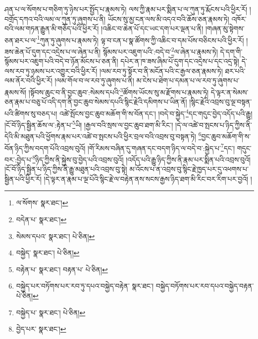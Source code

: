 ཤན་པ་ལ་སོགས་པ་གཅིག་ཏུ་ཉེས་པར་སྤྱོད་པ་རྣམས་ཏེ། ལས་ཀྱི་རྣམ་པར་སྨིན་པ་ལ་ཀུན་ཏུ་རྨོངས་པའི་ཕྱིར་རོ། །བགྲོད་དཀའ་བའི་ལམ་ལ་ཀུན་ཏུ་ཞུགས་པ་ནི། ཡོངས་སུ་མྱ་ངན་ལས་མི་འདའ་བའི་ཆོས་ཅན་རྣམས་ཏེ། འཁོར་བའི་ལམ་གཏན་རྒྱུན་མི་གཅོད་པའི་ཕྱིར་རོ། །འཆིང་བ་ཆེན་པོ་དང་ཡང་དག་པར་ལྡན་པ་ནི། །གཞན་མུ་སྟེགས་ཅན་ཐར་པ་ལ་\footnote{ལ་སོགས་  སྣར་ཐང་། }ཀུན་ཏུ་ཞུགས་པ་རྣམས་ཏེ། ལྟ་བ་ངན་པ་སྣ་ཚོགས་ཀྱི་འཆིང་བ་དམ་པོས་བཅིངས་པའི་ཕྱིར་རོ། །ཟས་ཆེན་པོ་དུག་དང་འདྲེས་པ་ལ་ཞེན་པ་ནི། སྙོམས་པར་འཇུག་པའི་:བདེ་བ་\footnote{བདེན་པ་  སྣར་ཐང་། }ལ་ཞེན་པ་རྣམས་ཏེ། དེ་དག་གི་སྙོམས་པར་འཇུག་པའི་བདེ་བ་ཉོན་མོངས་པ་ཅན་ནི། དཔེར་ན་ཁ་ཟས་ཞིམ་པོ་དུག་དང་འདྲེས་པ་དང་འདྲ་སྟེ། དེ་ལས་རབ་ཏུ་ཉམས་པར་འགྱུར་བའི་ཕྱིར་རོ། །ལམ་རབ་ཏུ་སྟོར་བ་ནི་མངོན་པའི་ང་རྒྱལ་ཅན་རྣམས་ཏེ། ཐར་པའི་ལམ་ནོར་བའི་ཕྱིར་རོ། །ལམ་གོལ་བ་ལ་རབ་ཏུ་ཞུགས་པ་ནི། མ་ངེས་པ་ཐེག་པ་དམན་པ་ལ་རབ་ཏུ་ཞུགས་པ་རྣམས་སོ། །སྟོབས་ཆུང་བ་ནི་བྱང་ཆུབ་:སེམས་དཔའི་\footnote{སེམས་དཔའ་  སྣར་ཐང་།  པེ་ཅིན། }ཚོགས་ཡོངས་སུ་མ་རྫོགས་པ་རྣམས་ཏེ། དེ་ལྟར་ན་སེམས་ཅན་རྣམ་པ་བཅུ་པོ་འདི་དག་ནི་བྱང་ཆུབ་སེམས་དཔའི་སྙིང་རྗེའི་དམིགས་པ་ཡིན་ནོ། །སྙིང་རྗེའི་འབྲས་བུ་ལྔ་བསྟན་པའི་ཚིགས་སུ་བཅད་པ། འཚེ་སྤོངས་བྱང་ཆུབ་མཆོག་གི་ས་བོན་དང་། །བདེ་བ་སྐྱེད་\footnote{བསྐྱེད་  སྣར་ཐང་།  པེ་ཅིན། }དང་གདུང་བྱེད་འདོད་པའི་རྒྱུ། །ངོ་བོ་ཉིད་སྦྱིན་ཆོས་ལ་:རྟེན་པ་\footnote{བརྟེན་པ་  སྣར་ཐང་། བརྟན་པ་  པེ་ཅིན། }ཡི། །རྒྱལ་བའི་སྲས་ལ་བྱང་ཆུབ་ཐག་མི་རིང་། །དེ་ལ་འཚེ་བ་སྤངས་པ་ཉིད་ཀྱིས་ནི་དེའི་མི་མཐུན་པའི་ཕྱོགས་རྣམ་པར་འཚེ་བ་སྤངས་པའི་ཕྱིར་བྲལ་བའི་འབྲས་བུ་བསྟན་ཏེ། \footnote{བསྐྱེད་པར་བཏོགས་པར་རབ་ཏུ་དཔའ་བསྐྱེད་བརྟེན་  སྣར་ཐང་། བསྐྱེད་བཏོགས་པར་རབ་དཔའ་བསྐྱེད་བརྟན་  པེ་ཅིན། }བྱང་ཆུབ་མཆོག་གི་ས་བོན་ཉིད་ཀྱིས་བདག་པོའི་འབྲས་བུའོ། །གོ་རིམས་བཞིན་དུ་གཞན་དང་བདག་ཉིད་ལ་བདེ་བ་:སྐྱེད་པ་\footnote{བསྐྱེད་པ་  སྣར་ཐང་།  པེ་ཅིན། }དང་། གདུང་བར་:བྱེད་པ་\footnote{བྱེད་པར་  སྣར་ཐང་། }ཉིད་ཀྱིས་ནི་སྐྱེས་བུ་བྱེད་པའི་འབྲས་བུའོ། །འདོད་པའི་རྒྱུ་ཉིད་ཀྱིས་ནི་རྣམ་པར་སྨིན་པའི་འབྲས་བུའོ། །ངོ་བོ་ཉིད་སྦྱིན་པ་ཉིད་ཀྱིས་ནི་རྒྱུ་མཐུན་པའི་འབྲས་བུ་སྟེ། མ་འོངས་པ་ན་འབྲས་བུ་སྙིང་རྗེ་ཁྱད་པར་དུ་འཕགས་པ་སྦྱིན་པའི་ཕྱིར་རོ། །དེ་ལྟར་ན་རྣམ་པ་ལྔ་པོའི་སྙིང་རྗེ་ལ་བརྟེན་ནས་སངས་རྒྱས་ཉིད་ཐག་མི་རིང་བར་རིག་པར་བྱའོ། །
